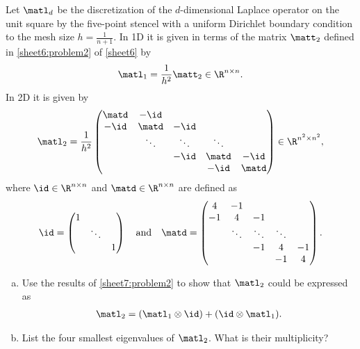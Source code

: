 \begin{Sheet}
  \begin{Problem}
    \label{sheet7:problem3}
    Let $\matl_d$ be the discretization of the $d$-dimensional Laplace
    operator on the unit square by the five-point stencel with a
    uniform Dirichlet boundary condition to the mesh size
    $h=\frac1{n+1}$.  In 1D it is given in terms of the matrix
    $\matt_2$ defined in \cref{sheet6:problem2} of \cref{sheet6} by
    \begin{gather*}
      \matl_1 = \frac1{h^2}\matt_2 \in\R^{n\times n}.
    \end{gather*}
    In 2D it is given by
    \begin{gather*}
      \matl_2 = \frac1{h^2}
      \begin{pmatrix}
        \matd &   -\id & & & \\
         -\id &  \matd & -\id   & & \\
              & \ddots & \ddots & \ddots & \\
              &        &   -\id &  \matd &   -\id\\
              &        &        &   -\id &  \matd
      \end{pmatrix}
      \in\R^{n^2\times n^2},
    \end{gather*}
    where $\id\in\R^{n\times n}$ and $\matd\in\R^{n\times n}$ are
    defined as
    \begin{gather*}
      \id =
      \begin{pmatrix}
        1 & & \\
          & \ddots & \\
          &        & 1
      \end{pmatrix}
      \quad\text{and}\quad
      \matd =
      \begin{pmatrix}
         4 & -1 &    && \\
        -1 &  4 & -1 && \\
           & \ddots & \ddots & \ddots & \\
           &    & -1 & 4 & -1 \\
           &    &    & -1 & 4
      \end{pmatrix}.
    \end{gather*}
    \begin{enumerate}[(a)]
    \item Use the results of \cref{sheet7:problem2} to show that
      $\matl_2$ could be expressed as
      \begin{gather*}
        \matl_2 = (\matl_1\otimes\id) + (\id\otimes \matl_1).
      \end{gather*}
    \item List the four smallest eigenvalues of $\matl_2$. What is
      their multiplicity?
    \end{enumerate}
  \end{Problem}


\end{Sheet}
